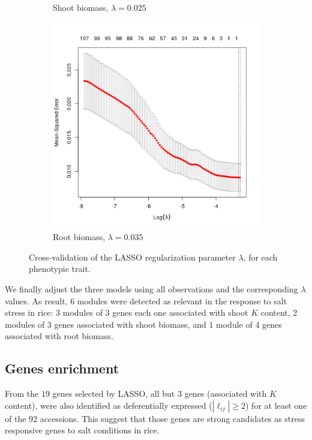 \documentclass[12pt,journal, onecolumn]{IEEEtran}
\begin{document}
\begin{figure}[h]
\begin{subfigure}{0.3\linewidth}
     \caption{Shoot biomass, $\lambda = 0.025$}\label{fig:lambda_BMshoot}
   \end{subfigure}
   \begin{subfigure}{0.3\linewidth} \centering
     \includegraphics[width=1\textwidth]{Figures/lambda_BMroot.png}
     \caption{Root biomass, $\lambda = 0.035$}\label{fig:lambda_BMroot}
   \end{subfigure}
\caption{Cross-validation of the LASSO regularization parameter $\lambda$, for each phenotypic trait.} \label{fig:cross-val}
\end{figure}

We finally adjust the three models using all observations and the corresponding $\lambda$ values. As result, 6 modules were detected as relevant in the response to salt stress in rice: 3 modules of 3 genes each one associated with shoot $K$ content, 2 modules of 3 genes associated with  shoot biomass, and 1 module of 4 genes associated with root biomass.\\


\subsection{Genes enrichment}
From the $19$ genes selected by LASSO, all but $3$ genes (associated with $K$ content), were also identified as deferentially expressed ($|\ell_{ij}| \geq 2$) for at least one of the $92$ accessions. This suggest that those genes are strong candidates as stress responsive genes to salt conditions in rice.\\
\end{document}
